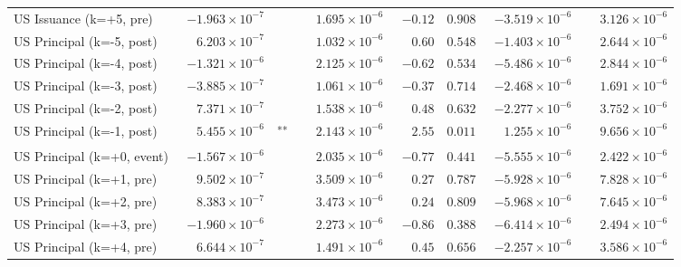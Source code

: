 \documentclass[10pt]{article}
\begin{document}
\begin{tabular}{@{}l|r@{}l rrr rr@{}}
US Issuance (k=+5, pre) & $-1.963\!\times\!10^{-7}$ & \textsuperscript{} & $\phantom{-}1.695\!\times\!10^{-6}$ & $-0.12$ & $0.908$ & $-3.519\!\times\!10^{-6}$ & $\phantom{-}3.126\!\times\!10^{-6}$ \\
\addlinespace[0.3em]
US Principal (k=-5, post) & $\phantom{-}6.203\!\times\!10^{-7}$ & \textsuperscript{} & $\phantom{-}1.032\!\times\!10^{-6}$ & $\phantom{-}0.60$ & $0.548$ & $-1.403\!\times\!10^{-6}$ & $\phantom{-}2.644\!\times\!10^{-6}$ \\
US Principal (k=-4, post) & $-1.321\!\times\!10^{-6}$ & \textsuperscript{} & $\phantom{-}2.125\!\times\!10^{-6}$ & $-0.62$ & $0.534$ & $-5.486\!\times\!10^{-6}$ & $\phantom{-}2.844\!\times\!10^{-6}$ \\
US Principal (k=-3, post) & $-3.885\!\times\!10^{-7}$ & \textsuperscript{} & $\phantom{-}1.061\!\times\!10^{-6}$ & $-0.37$ & $0.714$ & $-2.468\!\times\!10^{-6}$ & $\phantom{-}1.691\!\times\!10^{-6}$ \\
US Principal (k=-2, post) & $\phantom{-}7.371\!\times\!10^{-7}$ & \textsuperscript{} & $\phantom{-}1.538\!\times\!10^{-6}$ & $\phantom{-}0.48$ & $0.632$ & $-2.277\!\times\!10^{-6}$ & $\phantom{-}3.752\!\times\!10^{-6}$ \\
US Principal (k=-1, post) & $\phantom{-}5.455\!\times\!10^{-6}$ & \textsuperscript{**} & $\phantom{-}2.143\!\times\!10^{-6}$ & $\phantom{-}2.55$ & $0.011$ & $\phantom{-}1.255\!\times\!10^{-6}$ & $\phantom{-}9.656\!\times\!10^{-6}$ \\
US Principal (k=+0, event) & $-1.567\!\times\!10^{-6}$ & \textsuperscript{} & $\phantom{-}2.035\!\times\!10^{-6}$ & $-0.77$ & $0.441$ & $-5.555\!\times\!10^{-6}$ & $\phantom{-}2.422\!\times\!10^{-6}$ \\
US Principal (k=+1, pre) & $\phantom{-}9.502\!\times\!10^{-7}$ & \textsuperscript{} & $\phantom{-}3.509\!\times\!10^{-6}$ & $\phantom{-}0.27$ & $0.787$ & $-5.928\!\times\!10^{-6}$ & $\phantom{-}7.828\!\times\!10^{-6}$ \\
US Principal (k=+2, pre) & $\phantom{-}8.383\!\times\!10^{-7}$ & \textsuperscript{} & $\phantom{-}3.473\!\times\!10^{-6}$ & $\phantom{-}0.24$ & $0.809$ & $-5.968\!\times\!10^{-6}$ & $\phantom{-}7.645\!\times\!10^{-6}$ \\
US Principal (k=+3, pre) & $-1.960\!\times\!10^{-6}$ & \textsuperscript{} & $\phantom{-}2.273\!\times\!10^{-6}$ & $-0.86$ & $0.388$ & $-6.414\!\times\!10^{-6}$ & $\phantom{-}2.494\!\times\!10^{-6}$ \\
US Principal (k=+4, pre) & $\phantom{-}6.644\!\times\!10^{-7}$ & \textsuperscript{} & $\phantom{-}1.491\!\times\!10^{-6}$ & $\phantom{-}0.45$ & $0.656$ & $-2.257\!\times\!10^{-6}$ & $\phantom{-}3.586\!\times\!10^{-6}$ \\

\end{tabular}
\end{document}
